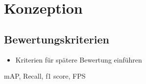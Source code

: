 \chapter{Konzeption}

\section{Bewertungskriterien}

\begin{itemize}
	\item Kriterien für spätere Bewertung einführen
\end{itemize}

mAP, Recall, f1 score, FPS